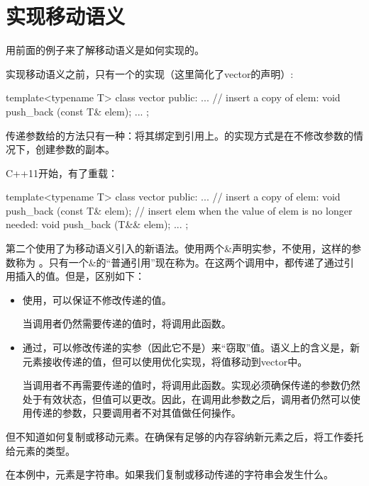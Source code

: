 \section{实现移动语义}
用前面的例子来了解移动语义是如何实现的。

实现移动语义之前，只有一个的实现（这里简化了vector的声明）:

\begin{cppcode}
template<typename T>
class vector {
	public:
	...
	// insert a copy of elem:
	void push_back (const T& elem);
	...
};
\end{cppcode}

传递参数给的方法只有一种：将其绑定到引用上。的实现方式是在不修改参数的情况下，创建参数的副本。

C++11开始，有了重载：

\begin{cppcode}
template<typename T>
class vector {
	public:
	...
	// insert a copy of elem:
	void push_back (const T& elem);
	// insert elem when the value of elem is no longer needed:
	void push_back (T&& elem);
	...
};
\end{cppcode}

第二个使用了为移动语义引入的新语法。使用两个\&声明实参，不使用，这样的参数称为 。只有一个\&的“普通引用”现在称为。在这两个调用中，都传递了通过引用插入的值。但是，区别如下：

\begin{itemize}
	\item 使用，可以保证不修改传递的值。

	当调用者仍然需要传递的值时，将调用此函数。
	\item 通过，可以修改传递的实参（因此它不是）来“窃取”值。语义上的含义是，新元素接收传递的值，但可以使用优化实现，将值移动到vector中。

	当调用者不再需要传递的值时，将调用此函数。实现必须确保传递的参数仍然处于有效状态，但值可以更改。因此，在调用此参数之后，调用者仍然可以使用传递的参数，只要调用者不对其值做任何操作。
\end{itemize}

但不知道如何复制或移动元素。在确保有足够的内存容纳新元素之后，将工作委托给元素的类型。

在本例中，元素是字符串。如果我们复制或移动传递的字符串会发生什么。

